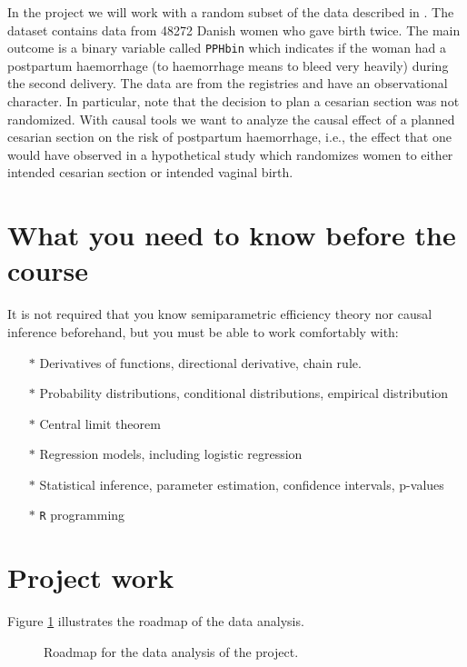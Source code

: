 \documentclass{article}
\newcommand{\1}{\mathbb{1}}
\begin{document}
In the project we will work with a random subset of the data described
in \cite{wikkelso2014prediction}. The dataset contains data from 48272
Danish women who gave birth twice. The main outcome is a binary
variable called \verb+PPHbin+ which indicates if the woman had a
postpartum haemorrhage (to haemorrhage means to bleed very heavily)
during the second delivery.
%
%
The data are from the registries and have an observational
character. In particular, note that the decision to plan a cesarian
section was not randomized. With causal tools we want to analyze the
causal effect of a planned cesarian section on the risk of postpartum
haemorrhage, i.e., the effect that one would have observed in a
hypothetical study which randomizes women to either intended cesarian
section or intended vaginal birth.

\section{What you need to know before the course}

It is not required that you know semiparametric efficiency theory nor
causal inference beforehand, but you must be able to work comfortably
with:

\begin{itemize}
\item[\(*\)] Derivatives of functions, directional derivative, chain rule.
\item[\(*\)] Probability distributions, conditional distributions, empirical
  distribution
\item[\(*\)] Central limit theorem
\item[\(*\)] Regression models, including logistic regression
\item[\(*\)] Statistical inference, parameter estimation, confidence
  intervals, p-values
\item[\(*\)] \verb+R+ programming
\end{itemize}

 
\section{Project work}

Figure \ref{fig:roadmap} illustrates the roadmap of the data analysis.

\begin{figure}[!h] %
\begin{center}
\end{center}
\caption{Roadmap for the data analysis of the project.}
\label{fig:roadmap}
\end{figure}
\end{document}
